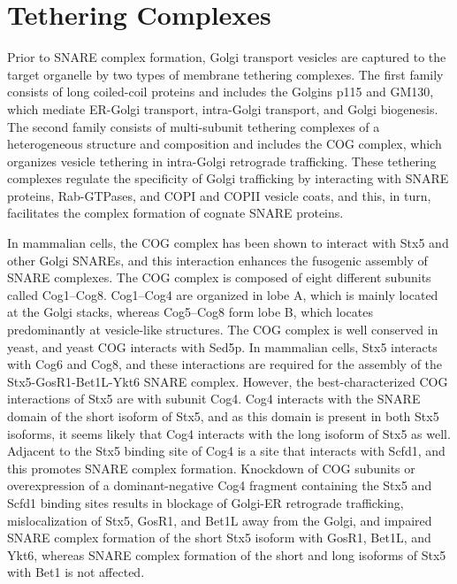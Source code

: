 \section{Tethering Complexes}

Prior to SNARE complex formation, Golgi transport vesicles are captured to the target organelle by two types of membrane tethering complexes\cite{climer_defects_2015,wang_p115snare_2015}. The first family consists of long coiled-coil proteins and includes the Golgins p115 and GM130, which mediate ER-Golgi transport, intra-Golgi transport, and Golgi biogenesis\cite{cottam_retrograde_2012,wang_p115snare_2015}. The second family consists of multi-subunit tethering complexes of a heterogeneous structure and composition and includes the COG complex, which organizes vesicle tethering in intra-Golgi retrograde trafficking\cite{cottam_retrograde_2012,climer_defects_2015}. These tethering complexes regulate the specificity of Golgi trafficking by interacting with SNARE proteins, Rab-GTPases, and COPI and COPII vesicle coats, and this, in turn, facilitates the complex formation of cognate SNARE proteins\cite{cottam_retrograde_2012,malsam_organization_2011,climer_defects_2015,wang_p115snare_2015}.

In mammalian cells, the COG complex has been shown to interact with Stx5 and other Golgi SNAREs, and this interaction enhances the fusogenic assembly of SNARE complexes\cite{shestakova_interaction_2007,willett_golgi_2013,laufman_deficiency_2013,laufman_cog_2013}. The COG complex is composed of eight different subunits called Cog1–Cog8. Cog1–Cog4 are organized in lobe A, which is mainly located at the Golgi stacks, whereas Cog5–Cog8 form lobe B, which locates predominantly at vesicle-like structures\cite{willett_cog_2016}. The COG complex is well conserved in yeast\cite{cottam_retrograde_2012}, and yeast COG interacts with Sed5p\cite{shestakova_interaction_2007,suvorova_sec34sec35p_2002}. In mammalian cells, Stx5 interacts with Cog6\cite{shestakova_interaction_2007,willett_cog_2013,laufman_cog_2013} and Cog8\cite{willett_cog_2013}, and these interactions are required for the assembly of the Stx5-GosR1-Bet1L-Ykt6 SNARE complex\cite{laufman_deficiency_2013}. However, the best-characterized COG interactions of Stx5 are with subunit Cog4\cite{shestakova_interaction_2007,willett_cog_2013,laufman_direct_2009,laufman_cog_2013}. Cog4 interacts with the SNARE domain of the short isoform of Stx5\cite{shestakova_interaction_2007}, and as this domain is present in both Stx5 isoforms, it seems likely that Cog4 interacts with the long isoform of Stx5 as well. Adjacent to the Stx5 binding site of Cog4 is a site that interacts with Scfd1, and this promotes SNARE complex formation\cite{shestakova_interaction_2007}. Knockdown of COG subunits or overexpression of a dominant-negative Cog4 fragment containing the Stx5 and Scfd1 binding sites results in blockage of Golgi-ER retrograde trafficking, mislocalization of Stx5, GosR1, and Bet1L away from the Golgi, and impaired SNARE complex formation of the short Stx5 isoform with GosR1, Bet1L, and Ykt6, whereas SNARE complex formation of the short and long isoforms of Stx5 with Bet1 is not affected\cite{shestakova_interaction_2007,laufman_direct_2009,laufman_cog_2013}.

